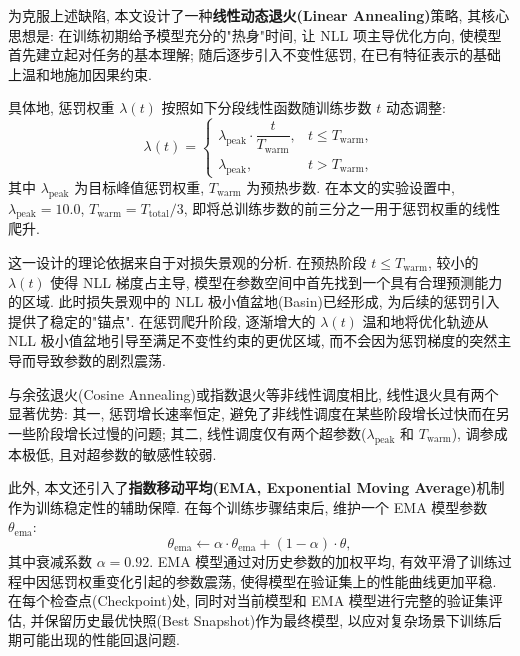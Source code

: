 \documentclass[a4paper,punct=banjiao,twoside]{ctexrep}
\theoremstyle{plain}
\theoremstyle{definition}
\theoremstyle{remark}
\begin{document}
为克服上述缺陷, 本文设计了一种\textbf{线性动态退火(Linear Annealing)}策略, 其核心思想是: 在训练初期给予模型充分的"热身"时间, 让 NLL 项主导优化方向, 使模型首先建立起对任务的基本理解; 随后逐步引入不变性惩罚, 在已有特征表示的基础上温和地施加因果约束.

具体地, 惩罚权重 $\lambda(t)$ 按照如下分段线性函数随训练步数 $t$ 动态调整:
\begin{equation}
    \lambda(t) = \begin{cases}
        \lambda_{\text{peak}} \cdot \dfrac{t}{T_{\text{warm}}}, & t \leq T_{\text{warm}}, \\[6pt]
        \lambda_{\text{peak}}, & t > T_{\text{warm}},
    \end{cases}
    \label{eq:linear_annealing}
\end{equation}
其中 $\lambda_{\text{peak}}$ 为目标峰值惩罚权重, $T_{\text{warm}}$ 为预热步数. 在本文的实验设置中, $\lambda_{\text{peak}} = 10.0$, $T_{\text{warm}} = T_{\text{total}} / 3$, 即将总训练步数的前三分之一用于惩罚权重的线性爬升.

这一设计的理论依据来自于对损失景观的分析. 在预热阶段 $t \leq T_{\text{warm}}$, 较小的 $\lambda(t)$ 使得 NLL 梯度占主导, 模型在参数空间中首先找到一个具有合理预测能力的区域. 此时损失景观中的 NLL 极小值盆地(Basin)已经形成, 为后续的惩罚引入提供了稳定的"锚点". 在惩罚爬升阶段, 逐渐增大的 $\lambda(t)$ 温和地将优化轨迹从 NLL 极小值盆地引导至满足不变性约束的更优区域, 而不会因为惩罚梯度的突然主导而导致参数的剧烈震荡.

与余弦退火(Cosine Annealing)或指数退火等非线性调度相比, 线性退火具有两个显著优势: 其一, 惩罚增长速率恒定, 避免了非线性调度在某些阶段增长过快而在另一些阶段增长过慢的问题; 其二, 线性调度仅有两个超参数($\lambda_{\text{peak}}$ 和 $T_{\text{warm}}$), 调参成本极低, 且对超参数的敏感性较弱.

此外, 本文还引入了\textbf{指数移动平均(EMA, Exponential Moving Average)}机制作为训练稳定性的辅助保障. 在每个训练步骤结束后, 维护一个 EMA 模型参数 $\theta_{\text{ema}}$:
\begin{equation}
    \theta_{\text{ema}} \leftarrow \alpha \cdot \theta_{\text{ema}} + (1 - \alpha) \cdot \theta,
\end{equation}
其中衰减系数 $\alpha = 0.92$. EMA 模型通过对历史参数的加权平均, 有效平滑了训练过程中因惩罚权重变化引起的参数震荡, 使得模型在验证集上的性能曲线更加平稳. 在每个检查点(Checkpoint)处, 同时对当前模型和 EMA 模型进行完整的验证集评估, 并保留历史最优快照(Best Snapshot)作为最终模型, 以应对复杂场景下训练后期可能出现的性能回退问题.
\end{document}
